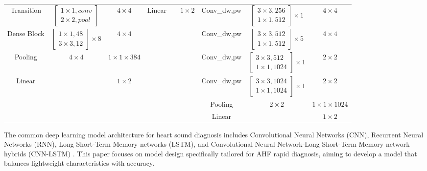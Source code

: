 \begin{table}[width=2\linewidth]
\begin{tabular*}{\tblwidth}{CCC|CCC|CCC}
Transition& $\begin{bmatrix}1\times1,conv\\2\times2,pool\end{bmatrix}$&$4\times4$&
Linear& & $1\times2$&
Conv\_dw,pw&$\begin{bmatrix}3\times3,256\\1\times1,512\end{bmatrix}\times1$ & $4\times4$\\ 
Dense Block& $\begin{bmatrix}1\times1,48\\3\times3,12\end{bmatrix}\times8$ &$4\times4$&
&&&
Conv\_dw,pw&$\begin{bmatrix}3\times3,512\\1\times1,512\end{bmatrix}\times5$ & $4\times4$\\
Pooling& $4\times4$& $1\times1\times384$&
&&&
Conv\_dw,pw&$\begin{bmatrix}3\times3,512\\1\times1,1024\end{bmatrix}\times1$ & $2\times2$\\
Linear& & $1\times2$&
  & & &
Conv\_dw,pw&$\begin{bmatrix}3\times3,1024\\1\times1,1024\end{bmatrix}\times1$ & $2\times2$\\
&&&
  & & &
Pooling& $2\times2$& $1\times1\times1024$\\
&&&
  & & &
Linear& & $1\times2$\\
\bottomrule
\end{tabular*}
\end{table}
The common deep learning model architecture for heart sound diagnosis includes Convolutional Neural Networks (CNN), Recurrent Neural Networks (RNN), Long Short-Term Memory networks (LSTM), and Convolutional Neural Network-Long Short-Term Memory network hybrids (CNN-LSTM) \cite{rubin2016classifying,arora2021transfer,li2021lightweight,shuvo2021cardioxnet}. This paper focuses on model design specifically tailored for AHF rapid diagnosis, aiming to develop a model that balances lightweight characteristics with accuracy.


